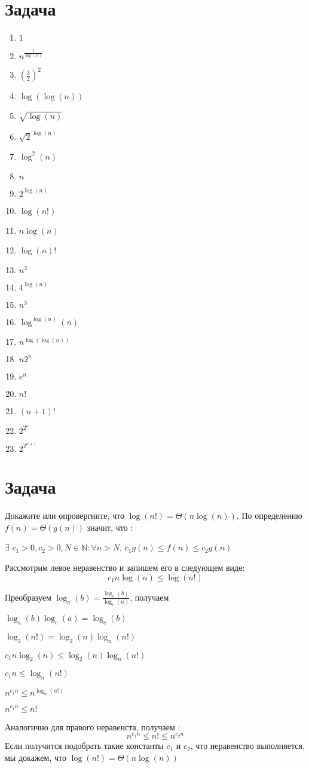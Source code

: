 \documentclass{article}
\begin{document}
\section{Задача }
\begin{multicols}{3}
\begin{enumerate}
\item $1$
\item $n^{\frac{1}{\log(n)}}$
\item $(\frac{3}{2})^{2}$
\item $\log(\log(n))$
\item $\sqrt{\log(n)}$
\item $\sqrt{2}^{\log(n)}$
\item $\log^{2}(n)$
\item $n$
\item $2^{\log(n)}$
\item $\log(n!)$
\item $n\log(n)$
\item $\log(n)!$
\item $n^{2}$
\item $4^{\log(n)}$
\item $n^{3}$
\item $\log^{\log(n)}(n)$
\item $n^{\log(\log(n))}$
\item $n2^{n}$
\item $e^{n}$
\item $n!$
\item $(n + 1)!$
\item $2^{2^{n}}$
\item $2^{2^{n + 1}}$
\end{enumerate}
\end{multicols}

\section{Задача }
Докажите или опровергните, что $\log(n!) = \Theta(n\log(n))$.
\newline
По определению $f(n) = \Theta(g(n))$ значит, что :
\begin{center}
	$\exists$   $c_{1} > 0, c_{2} > 0, N \in \mathbb{N} : \forall n > N$,  $c_{1}g(n) \leq f(n) \leq c_{2}g(n)$
\end{center}
	Рассмотрим левое неравенство и запишем его в следующем виде:
$$c_{1}n\log(n) \leq \log(n!)$$

Преобразуем	$\log_{a}(b) = \frac{\log_{c}(b)}{\log_{c}(a)}$, получаем
\begin{center} $\log_{a}(b)\log_{c}(a) = \log_{c}(b)$
	
$\log_{2}(n!) = \log_{2}(n)\log_{n}(n!)$

$c_{1}n\log_{2}(n) \leq \log_{2}(n)\log_{n}(n!)$

$c_{1}n \leq \log_{n}(n!)$

$n^{c_{1}n} \leq n^{\log_{n}(n!)}$

$n^{c_{1}n} \leq n!$
\end{center}
Аналогично для правого неравенста, получаем :
	$$n^{c_{1}n} \leq n! \leq n^{c_{2}n}$$
Если получится подобрать такие константы $c_{1}$ и $c_{2}$, что неравенство выполняется, мы докажем, что $\log(n!) = \Theta(n\log(n))$
\end{document}
